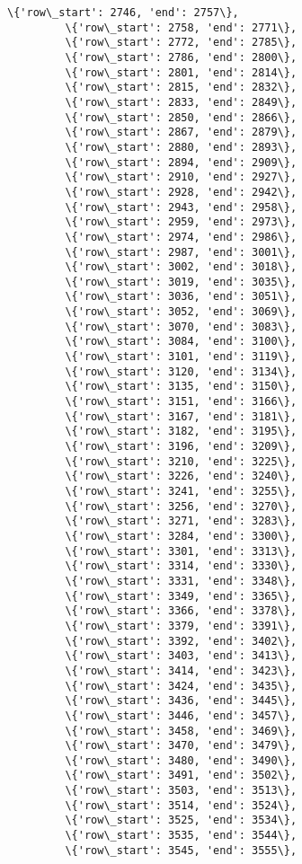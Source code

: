 \documentclass[11pt]{article}
\begin{document}
\begin{Verbatim}[commandchars=\\\{\}]
         \{'row\_start': 2746, 'end': 2757\},
         \{'row\_start': 2758, 'end': 2771\},
         \{'row\_start': 2772, 'end': 2785\},
         \{'row\_start': 2786, 'end': 2800\},
         \{'row\_start': 2801, 'end': 2814\},
         \{'row\_start': 2815, 'end': 2832\},
         \{'row\_start': 2833, 'end': 2849\},
         \{'row\_start': 2850, 'end': 2866\},
         \{'row\_start': 2867, 'end': 2879\},
         \{'row\_start': 2880, 'end': 2893\},
         \{'row\_start': 2894, 'end': 2909\},
         \{'row\_start': 2910, 'end': 2927\},
         \{'row\_start': 2928, 'end': 2942\},
         \{'row\_start': 2943, 'end': 2958\},
         \{'row\_start': 2959, 'end': 2973\},
         \{'row\_start': 2974, 'end': 2986\},
         \{'row\_start': 2987, 'end': 3001\},
         \{'row\_start': 3002, 'end': 3018\},
         \{'row\_start': 3019, 'end': 3035\},
         \{'row\_start': 3036, 'end': 3051\},
         \{'row\_start': 3052, 'end': 3069\},
         \{'row\_start': 3070, 'end': 3083\},
         \{'row\_start': 3084, 'end': 3100\},
         \{'row\_start': 3101, 'end': 3119\},
         \{'row\_start': 3120, 'end': 3134\},
         \{'row\_start': 3135, 'end': 3150\},
         \{'row\_start': 3151, 'end': 3166\},
         \{'row\_start': 3167, 'end': 3181\},
         \{'row\_start': 3182, 'end': 3195\},
         \{'row\_start': 3196, 'end': 3209\},
         \{'row\_start': 3210, 'end': 3225\},
         \{'row\_start': 3226, 'end': 3240\},
         \{'row\_start': 3241, 'end': 3255\},
         \{'row\_start': 3256, 'end': 3270\},
         \{'row\_start': 3271, 'end': 3283\},
         \{'row\_start': 3284, 'end': 3300\},
         \{'row\_start': 3301, 'end': 3313\},
         \{'row\_start': 3314, 'end': 3330\},
         \{'row\_start': 3331, 'end': 3348\},
         \{'row\_start': 3349, 'end': 3365\},
         \{'row\_start': 3366, 'end': 3378\},
         \{'row\_start': 3379, 'end': 3391\},
         \{'row\_start': 3392, 'end': 3402\},
         \{'row\_start': 3403, 'end': 3413\},
         \{'row\_start': 3414, 'end': 3423\},
         \{'row\_start': 3424, 'end': 3435\},
         \{'row\_start': 3436, 'end': 3445\},
         \{'row\_start': 3446, 'end': 3457\},
         \{'row\_start': 3458, 'end': 3469\},
         \{'row\_start': 3470, 'end': 3479\},
         \{'row\_start': 3480, 'end': 3490\},
         \{'row\_start': 3491, 'end': 3502\},
         \{'row\_start': 3503, 'end': 3513\},
         \{'row\_start': 3514, 'end': 3524\},
         \{'row\_start': 3525, 'end': 3534\},
         \{'row\_start': 3535, 'end': 3544\},
         \{'row\_start': 3545, 'end': 3555\},

\end{Verbatim}
\end{document}
